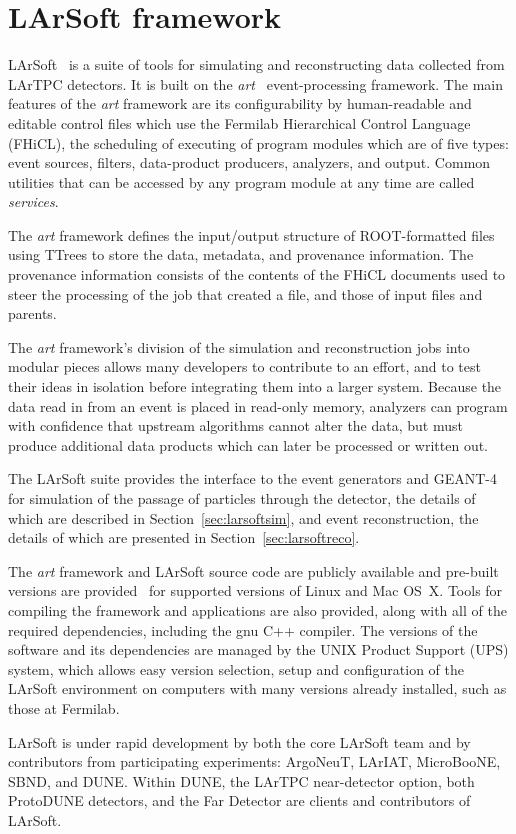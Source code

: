 \section{LArSoft framework}

LArSoft~\cite{larsoft-web} is a suite of tools for simulating and
reconstructing data collected from LArTPC detectors.  It is
built on the \textit{art}~\cite{art-web} event-processing framework.  The
main features of the \textit{art} framework are its configurability by
human-readable and editable control files which use the Fermilab
Hierarchical Control Language (FHiCL), the scheduling of executing of
program modules which are of five types: event sources, filters,
data-product producers, analyzers, and output.  Common utilities that
can be accessed by any program module at any time are called \textit{services}.

The \textit{art} framework defines the input/output structure of
ROOT-formatted files using TTrees to store the data, metadata, and
provenance information.  The provenance information consists of the
contents of the FHiCL documents used to steer the processing of the
job that created a file, and those of input files and parents.  

The
\textit{ art} framework's division of the simulation and reconstruction
jobs into modular pieces allows many developers to contribute to an
effort, and to test their ideas in isolation before integrating them
into a larger system.  Because the data read in from an event is
placed in read-only memory, analyzers can program with confidence that
upstream algorithms cannot alter the data, but must produce additional
data products which can later be processed or written out.

The LArSoft suite provides the interface to the event generators and
GEANT-4~\cite{geant4} 
for simulation of the passage of particles
through the detector, the details of which are described in
Section~\ref{sec:larsoftsim}, and event reconstruction, the details of
which are presented in Section~\ref{sec:larsoftreco}.  

The \textit{art}
framework and LArSoft source code are publicly available and pre-built
versions are provided~\cite{scisoft-web} for supported versions of Linux and Mac
OS~X.  Tools for compiling the framework and
applications are also provided, along with all of the required
dependencies, including the gnu C++ compiler.  The versions of the
software and its dependencies are managed by the UNIX Product Support (UPS) system,
which allows easy version selection, setup and configuration of the LArSoft
environment on computers with many versions already installed, such as
those at Fermilab.  

LArSoft is under rapid development by both the
core LArSoft team and by contributors from participating experiments:
ArgoNeuT, LArIAT, MicroBooNE, SBND, and DUNE.  Within DUNE, the LArTPC
near-detector option, both ProtoDUNE detectors, and the Far Detector
are clients and contributors of LArSoft.